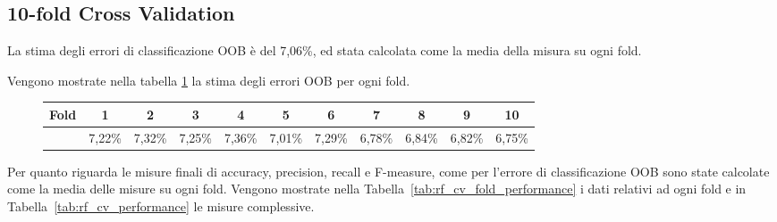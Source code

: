 \subsection{10-fold Cross Validation}
La stima degli errori di classificazione OOB è del 7,06\%, ed stata calcolata 
come la media della misura su ogni fold.

Vengono mostrate nella tabella \ref{tab:rf_cv_OOB} la stima degli errori OOB 
per ogni fold.

\begin{figure}[H]
	\centering
	\begin{tabular}{lcccccccccc}
		\toprule
		Fold & \textbf{1} & \textbf{2} & \textbf{3} & \textbf{4} & 
		\textbf{5} & \textbf{6} & \textbf{7} & \textbf{8} & 
		\textbf{9} & \textbf{10} \\
		\midrule
		&7,22\% & 7,32\% & 7,25\% & 7,36\% & 7,01\% & 7,29\% & 6,78\% & 6,84\% 
		& 6,82\% & 6,75\%  	\\ 
		\bottomrule
	\end{tabular}
	\label{tab:rf_cv_OOB}
\end{figure}

Per quanto riguarda le misure finali di accuracy, precision, recall e 
F-measure, come per l'errore di classificazione OOB sono state calcolate come 
la media delle misure su ogni fold. 
Vengono mostrate nella Tabella~\ref{tab:rf_cv_fold_performance} i dati relativi 
ad ogni fold e in Tabella~\ref{tab:rf_cv_performance} le misure complessive.

